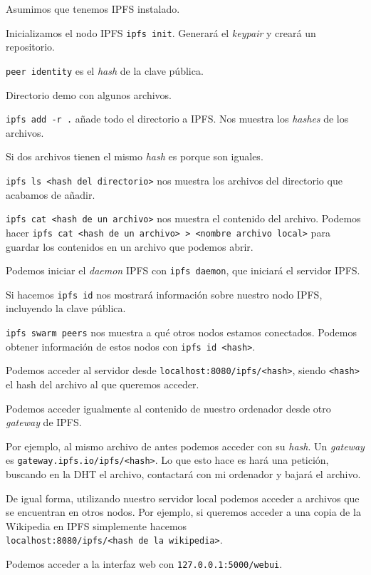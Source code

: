 Asumimos que tenemos IPFS instalado.

Inicializamos el nodo IPFS \texttt{ipfs\ init}. Generará el
\emph{keypair} y creará un repositorio.

\texttt{peer\ identity} es el \emph{hash} de la clave pública.

Directorio demo con algunos archivos.

\texttt{ipfs\ add\ -r\ .} añade todo el directorio a IPFS. Nos muestra
los \emph{hashes} de los archivos.

Si dos archivos tienen el mismo \emph{hash} es porque son iguales.

\texttt{ipfs\ ls\ \textless{}hash\ del\ directorio\textgreater{}} nos
muestra los archivos del directorio que acabamos de añadir.

\texttt{ipfs\ cat\ \textless{}hash\ de\ un\ archivo\textgreater{}} nos
muestra el contenido del archivo. Podemos hacer
\texttt{ipfs\ cat\ \textless{}hash\ de\ un\ archivo\textgreater{}\ \textgreater{}\ \textless{}nombre\ archivo\ local\textgreater{}}
para guardar los contenidos en un archivo que podemos abrir.

Podemos iniciar el \emph{daemon} IPFS con \texttt{ipfs\ daemon}, que
iniciará el servidor IPFS.

Si hacemos \texttt{ipfs\ id} nos mostrará información sobre nuestro nodo
IPFS, incluyendo la clave pública.

\texttt{ipfs\ swarm\ peers} nos muestra a qué otros nodos estamos
conectados. Podemos obtener información de estos nodos con
\texttt{ipfs\ id\ \textless{}hash\textgreater{}}.

Podemos acceder al servidor desde
\texttt{localhost:8080/ipfs/\textless{}hash\textgreater{}}, siendo
\texttt{\textless{}hash\textgreater{}} el hash del archivo al que
queremos acceder.

Podemos acceder igualmente al contenido de nuestro ordenador desde otro
\emph{gateway} de IPFS.

Por ejemplo, al mismo archivo de antes podemos acceder con su
\emph{hash}. Un \emph{gateway} es
\texttt{gateway.ipfs.io/ipfs/\textless{}hash\textgreater{}}. Lo que esto
hace es hará una petición, buscando en la DHT el archivo, contactará con
mi ordenador y bajará el archivo.

De igual forma, utilizando nuestro servidor local podemos acceder a
archivos que se encuentran en otros nodos. Por ejemplo, si queremos
acceder a una copia de la Wikipedia en IPFS simplemente hacemos
\texttt{localhost:8080/ipfs/\textless{}hash\ de\ la\ wikipedia\textgreater{}}.

Podemos acceder a la interfaz web con \texttt{127.0.0.1:5000/webui}.
